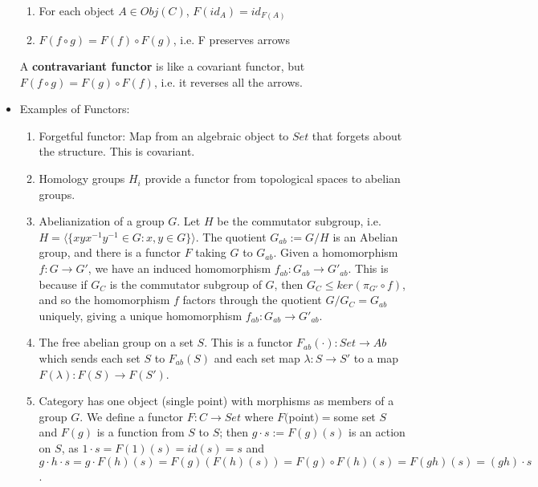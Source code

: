 \documentclass[11pt, oneside]{amsart}   	%
\theoremstyle{definition}
\begin{document}
\begin{itemize}
\begin{enumerate}
			\item For each object $A\in Obj(C)$, $F(id_A) = id_{F(A)}$
			
			\item $F(f\circ g) = F(f)\circ F(g)$, i.e. F preserves arrows
		
		\end{enumerate}
		
		A \textbf{contravariant functor} is like a covariant functor, but $F(f\circ g) = F(g)\circ F(f)$, i.e. it reverses all the arrows.
	
	\item Examples of Functors:
	
		\begin{enumerate}
		
			\item Forgetful functor: Map from an algebraic object to $Set$ that forgets about the structure. This is covariant.
			
			\item Homology groups $H_i$ provide a functor from topological spaces to abelian groups.
			
			\item Abelianization of a group $G$. Let $H$ be the commutator subgroup, i.e. $H = \langle\{xyx^{-1}y^{-1} \in G : x, y\in G\}\rangle$. 
			The quotient $G_{ab} := G/H$ is an Abelian group, and there is a functor $F$ taking $G$ to $G_{ab}$. Given a homomorphism $f : G
			\rightarrow G'$, we have an induced homomorphism $f_{ab} : G_{ab}\rightarrow G'_{ab}$. This is because if $G_C$ is the commutator 
			subgroup of $G$, then $G_C\leq ker(\pi_{G'}\circ f)$, and so the homomorphism $f$ factors through the quotient $G/G_C = G_{ab}$ 
			uniquely, giving a unique homomorphism $f_{ab} : G_{ab}\rightarrow G'_{ab}$.
			
			\item The free abelian group on a set $S$. This is a functor $F_{ab}(\cdot) : Set\rightarrow Ab$ which sends each set $S$ to 
			$F_{ab}(S)$ and each set map $\lambda : S\rightarrow S'$ to a map $F(\lambda) : F(S)\rightarrow F(S')$. 
			
			\item Category has one object (single point) with morphisms as members of a group $G$. We define a functor $F: C\rightarrow Set$ 
			where $F($point$) = $some set $S$ and $F(g)$ is a function from $S$ to $S$; then $g\cdot s := F(g)(s)$ is an action on $S$, as 
			$1\cdot s = F(1)(s) = id(s) = s$ and $g\cdot h\cdot s = g\cdot F(h)(s) = F(g)(F(h)(s)) = F(g)\circ F(h) (s) = F(gh)(s) = (gh)\cdot s$.
			

\end{enumerate}
\end{itemize}
\end{document}
